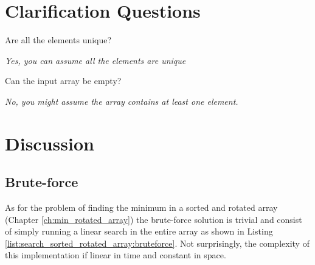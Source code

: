 \section{Clarification Questions}

\begin{QandA}
	\item \begin{questionitem} \begin{question} Are all the elements unique?   \end{question} 	 
    \begin{answered}
		\textit{Yes, you can assume all the elements are unique}
	\end{answered} \end{questionitem}
	\item \begin{questionitem} \begin{question} Can the input array be empty?  \end{question} 	 
    \begin{answered}
		\textit{No, you might assume the array contains at least one element.}
	\end{answered} \end{questionitem}
\end{QandA}


\section{Discussion}
\label{search_sorted_rotated_array:sec:discussion}


\subsection{Brute-force}
\label{search_sorted_rotated_array:sec:bruteforce}
As for the problem of finding the minimum in a sorted and rotated array (Chapter \ref{ch:min_rotated_array}) the brute-force solution is trivial and consist of simply running a linear search in the entire array as shown in Listing \ref{list:search_sorted_rotated_array:bruteforce}.
Not surprisingly, the complexity of this implementation if linear in time and constant in space.



